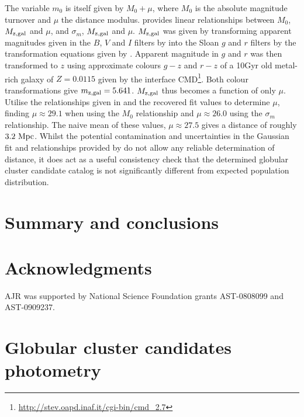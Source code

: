 \documentclass[useAMS,usenatbib]{mn2e}
\begin{document}
 The variable $m_0$ is itself given by $M_0 + \mu$, where $M_0$ is the absolute magnitude turnover and $\mu$ the distance modulus. \citet{Villegas2010} provides linear relationships between $M_0$, $M_{\rm{z,gal}}$ and $\mu$, and $\sigma_m$, $M_{\rm{z,gal}}$ and $\mu$.  $M_{\rm{z,gal}}$ was given by transforming apparent magnitudes given in the $B$, $V$ and $I$ filters by \citet{Fingerhut2003} into the Sloan $g$ and $r$ filters by the transformation equations given by \citet{Jester2005}. Apparent magnitude in $g$ and $r$ was then transformed to $z$ using approximate colours $g-z$ and $r-z$ of a 10Gyr old metal-rich galaxy of $Z=0.0115$ given by the interface CMD\footnote{\url{http://stev.oapd.inaf.it/cgi-bin/cmd_2.7}}. Both colour transformations give $m_{\rm{z,gal}} = 5.641$. $M_{\rm{z,gal}}$ thus becomes a function of only $\mu$. Utilise the relationships given in \citet{Villegas2010} and the recovered fit values to determine $\mu$, finding $\mu \approx 29.1$ when using the $M_0$ relationship and $\mu \approx 26.0$ using the $\sigma_m$ relationship. The naive mean of these values, $\mu \approx 27.5$ gives a distance of roughly $3.2\ \rm{Mpc}$.  Whilst the potential contamination and uncertainties in the Gaussian fit and relationships provided by \citet{Villegas2010} do not allow any reliable determination of distance, it does act as a useful consistency check that the determined globular cluster candidate catalog is not significantly different from expected population distribution.
 


\section{Summary and conclusions}
\label{sec:conclusions}

\lipsum[1-2]

\section*{Acknowledgments}

AJR was supported by National Science Foundation grants AST-0808099
and AST-0909237.




\appendix
\onecolumn
\section{Globular cluster candidates photometry}
\label{sec:appendix}
\end{document}
